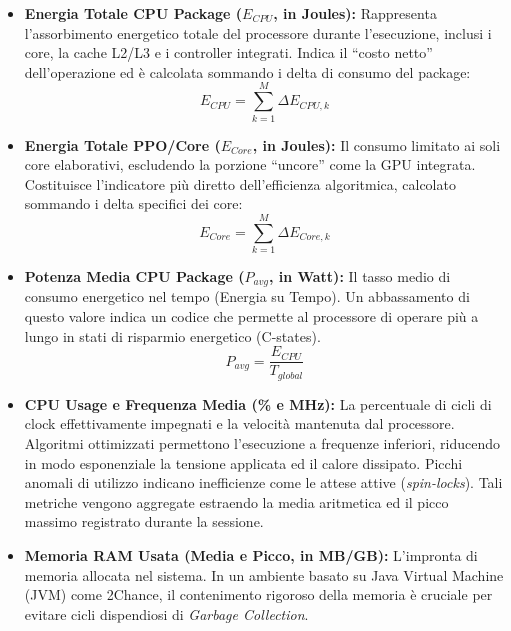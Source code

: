 \begin{itemize}
\begin{itemize}
		    \item \textbf{Energia Totale CPU Package ($E_{CPU}$, in Joules):} Rappresenta l'assorbimento energetico totale del processore durante l'esecuzione, inclusi i core, la cache L2/L3 e i controller integrati. Indica il ``costo netto'' dell'operazione ed è calcolata sommando i delta di consumo del package:
		    \begin{equation}
		        E_{CPU} = \sum_{k=1}^{M} \Delta E_{CPU, k}
		    \end{equation}

		    \item \textbf{Energia Totale PPO/Core ($E_{Core}$, in Joules):} Il consumo limitato ai soli core elaborativi, escludendo la porzione ``uncore'' come la GPU integrata. Costituisce l'indicatore più diretto dell'efficienza algoritmica, calcolato sommando i delta specifici dei core:
		    \begin{equation}
		        E_{Core} = \sum_{k=1}^{M} \Delta E_{Core, k}
		    \end{equation}

		    \item \textbf{Potenza Media CPU Package ($P_{avg}$, in Watt):} Il tasso medio di consumo energetico nel tempo (Energia su Tempo). Un abbassamento di questo valore indica un codice che permette al processore di operare più a lungo in stati di risparmio energetico (C-states).
		    \begin{equation}
		        P_{avg} = \frac{E_{CPU}}{T_{global}}
		    \end{equation}

		    \item \textbf{CPU Usage e Frequenza Media (\% e MHz):} La percentuale di cicli di clock effettivamente impegnati e la velocità mantenuta dal processore. Algoritmi ottimizzati permettono l'esecuzione a frequenze inferiori, riducendo in modo esponenziale la tensione applicata ed il calore dissipato. Picchi anomali di utilizzo indicano inefficienze come le attese attive (\textit{spin-locks}). Tali metriche vengono aggregate estraendo la media aritmetica ed il picco massimo registrato durante la sessione.

		    \item \textbf{Memoria RAM Usata (Media e Picco, in MB/GB):} L'impronta di memoria allocata nel sistema. In un ambiente basato su Java Virtual Machine (JVM) come 2Chance, il contenimento rigoroso della memoria è cruciale per evitare cicli dispendiosi di \textit{Garbage Collection}.
		\end{itemize}
\end{itemize}

